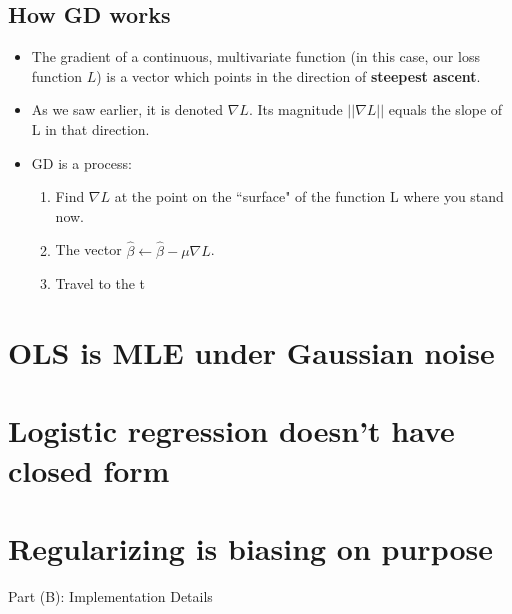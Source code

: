 \documentclass[11pt]{article}
\begin{document}
    \subsection{How GD works}
        \begin{itemize}
            \item The gradient of a continuous, multivariate function (in this case, our loss function $L$) is a vector which points in the direction of \textbf{steepest ascent}.
            \item As we saw earlier, it is denoted $\nabla L$. Its magnitude $||\nabla L||$ equals the slope of L in that direction. 
            \item GD is a process:
                \begin{enumerate}
                    \item Find $\nabla L$ at the point on the ``surface" of the function L where you stand now. 
                    \item The vector $\hat{\beta} \leftarrow \hat{\beta} - \mu\nabla L$.
                    \item Travel to the t
                \end{enumerate}
        \end{itemize}

\section{OLS is MLE under Gaussian noise}\label{sec:MLE}

\section{Logistic regression doesn't have closed form}\label{sec:logistic}

\section{Regularizing is biasing on purpose}\label{sec:regularizing}

\vspace{0.5cm}

{\huge Part (B): Implementation Details}
\end{document}
